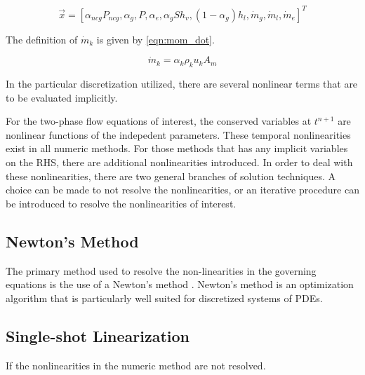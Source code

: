 \begin{equation}
\label{eqn:independent_variables}
\vec{x} = [\alpha_{ncg}P_{ncg}, \alpha_g, P, \alpha_e, \alpha_gS h_v, (1 - \alpha_g) h_l, \dot{m}_g, \dot{m}_l, \dot{m}_e]^{T}
\end{equation}

The definition of $\dot{m}_k$ is given by \eqref{eqn:mom_dot}.

\begin{equation}
\label{eqn:mom_dot}
\dot{m}_k = \alpha_k \rho_k u_k A_m
\end{equation}

In the particular discretization utilized, there are several nonlinear terms that are to be evaluated implicitly.

For the two-phase flow equations of interest, the conserved variables at $t^{n+1}$ are nonlinear functions of the indepedent parameters.
These temporal nonlinearities exist in all numeric methods.
For those methods that has any implicit variables on the RHS, there are additional nonlinearities introduced.
In order to deal with these nonlinearities, there are two general branches of solution techniques.
A choice can be made to not resolve the nonlinearities, or an iterative procedure can be introduced to resolve the nonlinearities of interest.

\subsection{Newton's Method}
\label{subsect:newtons_method}
The primary method used to resolve the non-linearities in the governing equations is the use of a Newton's method \cite{Deuflhard2004}.
Newton's method is an optimization algorithm that is particularly well suited for discretized systems of PDEs.

\subsection{Single-shot Linearization}
\label{subsect:single_shot}
If the nonlinearities in the numeric method are not resolved.
